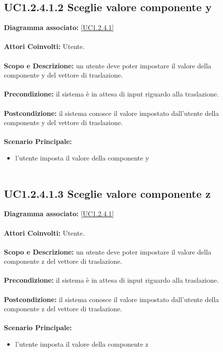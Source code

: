 \subsection{UC1.2.4.1.2 Sceglie valore componente y}
\textbf{Diagramma associato:}
\ref{UC1.2.4.1} \\ \\
\textbf{Attori Coinvolti:}
Utente. \\ \\
\textbf{Scopo e Descrizione:}
un utente deve poter impostare il valore della componente y del vettore di traslazione. \\ \\
\textbf{Precondizione:}
il sistema è in attesa di input riguardo alla traslazione. \\ \\
\textbf{Postcondizione:}
il sistema conosce il valore impostato dall'utente della componente y del vettore di traslazione. \\ \\
\textbf{Scenario Principale:}
\begin{itemize}
\item l'utente imposta il valore della componente y
\\ \\ \end{itemize}


\subsection{UC1.2.4.1.3 Sceglie valore componente z}
\textbf{Diagramma associato:}
\ref{UC1.2.4.1} \\ \\
\textbf{Attori Coinvolti:}
Utente. \\ \\
\textbf{Scopo e Descrizione:}
un utente deve poter impostare il valore della componente z del vettore di traslazione. \\ \\
\textbf{Precondizione:}
il sistema è in attesa di input riguardo alla traslazione. \\ \\
\textbf{Postcondizione:}
il sistema conosce il valore impostato dall'utente della componente z del vettore di traslazione. \\ \\
\textbf{Scenario Principale:}
\begin{itemize}
\item l'utente imposta il valore della componente z
\\ \\ \end{itemize}


